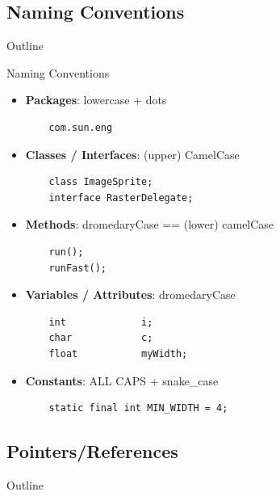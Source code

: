 \documentclass[English,c,%
hyperref={%
    pdftitle={FISA-DE2 OOP in Java},%
    pdfauthor={Muller, Gravier, Laforest, Subercaze},%
    pdfsubject={OOP in Java},%
    pdfkeywords={OOP, Java},%
    colorlinks=true,%
    urlcolor=blue,%
    linkcolor=%
    },%
xcolor={pdftex,svgnames} %
]{beamer}
\begin{document}
\subsection{Naming Conventions}
   \begin{frame}{Outline}
       \tableofcontents[currentsubsection]
   \end{frame}

\begin{frame}[fragile]{Naming Conventions}

{\small
  \begin{itemize}
%
    \item \textbf{Packages}: lowercase + dots \\
\begin{verbatim}
    com.sun.eng
\end{verbatim} %
    \item \textbf{Classes / Interfaces}: (upper) CamelCase\\
\begin{verbatim}
    class ImageSprite;
    interface RasterDelegate;
\end{verbatim}
%
    \item \textbf{Methods}: dromedaryCase == (lower) camelCase \\
\begin{verbatim}
    run();
    runFast();
\end{verbatim}
%
    \item \textbf{Variables / Attributes}: dromedaryCase \\
\begin{verbatim}
    int             i;
    char            c;
    float           myWidth;
\end{verbatim}
%
    \item \textbf{Constants}: ALL CAPS + snake\_case \\
\begin{verbatim}
    static final int MIN_WIDTH = 4;
\end{verbatim}
%
\end{itemize}
}

\end{frame}

\subsection{Pointers/References}
   \begin{frame}{Outline}
       \tableofcontents[currentsubsection]
   \end{frame}
\end{document}
